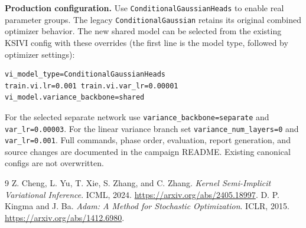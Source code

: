 \documentclass[11pt,a4paper]{article}
\begin{document}
\textbf{Production configuration.} Use \texttt{ConditionalGaussianHeads} to enable real parameter groups. The legacy \texttt{ConditionalGaussian} retains its original combined optimizer behavior. The new shared model can be selected from the existing KSIVI config with these overrides (the first line is the model type, followed by optimizer settings):
\begin{verbatim}
vi_model_type=ConditionalGaussianHeads
train.vi.lr=0.001 train.vi.var_lr=0.00001
vi_model.variance_backbone=shared
\end{verbatim}
For the selected separate network use \texttt{variance\_backbone=separate} and \texttt{var\_lr=0.00003}. For the linear variance branch set \texttt{variance\_num\_layers=0} and \texttt{var\_lr=0.001}. Full commands, phase order, evaluation, report generation, and source changes are documented in the campaign README. Existing canonical configs are not overwritten.


\begin{thebibliography}{9}
 Z. Cheng, L. Yu, T. Xie, S. Zhang, and C. Zhang.
\emph{Kernel Semi-Implicit Variational Inference}. ICML, 2024.
\url{https://arxiv.org/abs/2405.18997}.
 D. P. Kingma and J. Ba.
\emph{Adam: A Method for Stochastic Optimization}. ICLR, 2015.
\url{https://arxiv.org/abs/1412.6980}.
\end{thebibliography}
\end{document}
